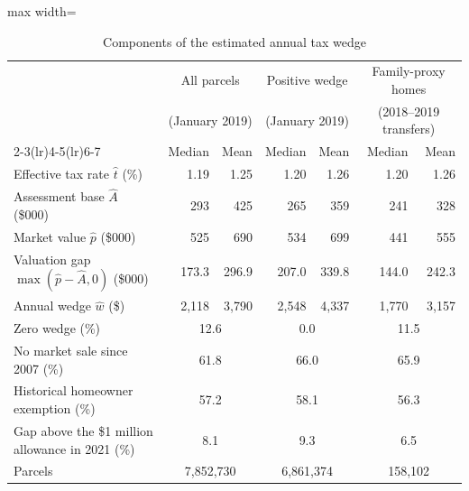 \begin{table}[!ht]\centering
\caption{Components of the estimated annual tax wedge}\label{tab:wedge_components}
\begin{adjustbox}{max width=\textwidth}{\small\setlength{\tabcolsep}{5pt}
\begin{tabular}{lrrrrrr}\toprule
 & \multicolumn{2}{c}{All parcels} & \multicolumn{2}{c}{Positive wedge} & \multicolumn{2}{c}{Family-proxy homes} \\
 & \multicolumn{2}{c}{(January 2019)} & \multicolumn{2}{c}{(January 2019)} & \multicolumn{2}{c}{(2018--2019 transfers)} \\
\cmidrule(lr){2-3}\cmidrule(lr){4-5}\cmidrule(lr){6-7}
 & Median & Mean & Median & Mean & Median & Mean \\\midrule
Effective tax rate $\hat t$ (\%) & 1.19 & 1.25 & 1.20 & 1.26 & 1.20 & 1.26 \\
Assessment base $\hat A$ (\$000) & 293 & 425 & 265 & 359 & 241 & 328 \\
Market value $\hat p$ (\$000) & 525 & 690 & 534 & 699 & 441 & 555 \\
Valuation gap $\max(\hat p-\hat A,0)$ (\$000) & 173.3 & 296.9 & 207.0 & 339.8 & 144.0 & 242.3 \\
Annual wedge $\hat w$ (\$) & 2,118 & 3,790 & 2,548 & 4,337 & 1,770 & 3,157 \\
\midrule
Zero wedge (\%) & \multicolumn{2}{c}{12.6} & \multicolumn{2}{c}{0.0} & \multicolumn{2}{c}{11.5} \\
No market sale since 2007 (\%) & \multicolumn{2}{c}{61.8} & \multicolumn{2}{c}{66.0} & \multicolumn{2}{c}{65.9} \\
Historical homeowner exemption (\%) & \multicolumn{2}{c}{57.2} & \multicolumn{2}{c}{58.1} & \multicolumn{2}{c}{56.3} \\
Gap above the \$1 million allowance in 2021 (\%) & \multicolumn{2}{c}{8.1} & \multicolumn{2}{c}{9.3} & \multicolumn{2}{c}{6.5} \\
Parcels & \multicolumn{2}{c}{7,852,730} & \multicolumn{2}{c}{6,861,374} & \multicolumn{2}{c}{158,102} \\
\bottomrule\end{tabular}}\end{adjustbox}
\begin{minipage}{0.96\textwidth}\end{minipage}\end{table}
